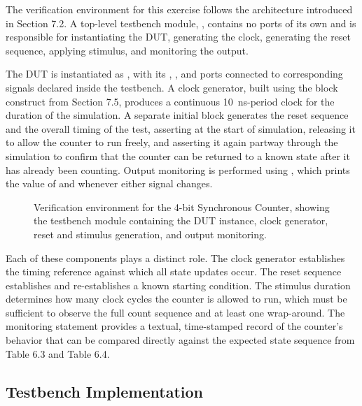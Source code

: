 The verification environment for this exercise follows the architecture introduced in Section 7.2. A top-level testbench module, , contains no ports of its own and is responsible for instantiating the DUT, generating the clock, generating the reset sequence, applying stimulus, and monitoring the output.

The DUT is instantiated as , with its , , and  ports connected to corresponding signals declared inside the testbench. A clock generator, built using the  block construct from Section 7.5, produces a continuous 10~ns-period clock for the duration of the simulation. A separate initial block generates the reset sequence and the overall timing of the test, asserting  at the start of simulation, releasing it to allow the counter to run freely, and asserting it again partway through the simulation to confirm that the counter can be returned to a known state after it has already been counting. Output monitoring is performed using , which prints the value of  and  whenever either signal changes.


\begin{figure}[h]
\centering
\caption{Verification environment for the 4-bit Synchronous Counter, showing the testbench module containing the DUT instance, clock generator, reset and stimulus generation, and output monitoring.}
\label{fig:counter_tb_arch}
\end{figure}

Each of these components plays a distinct role. The clock generator establishes the timing reference against which all state updates occur. The reset sequence establishes and re-establishes a known starting condition. The stimulus duration determines how many clock cycles the counter is allowed to run, which must be sufficient to observe the full count sequence and at least one wrap-around. The monitoring statement provides a textual, time-stamped record of the counter's behavior that can be compared directly against the expected state sequence from Table 6.3 and Table 6.4.

\subsection{Testbench Implementation}

